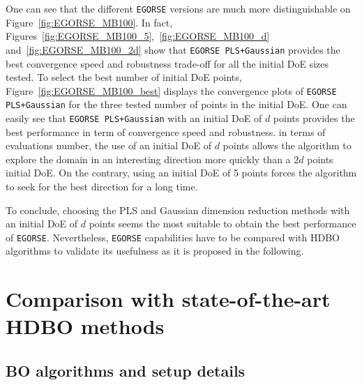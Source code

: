One can see that the different \texttt{EGORSE} versions are much more distinguishable on Figure~\ref{fig:EGORSE_MB100}. 
In fact, Figures~\ref{fig:EGORSE_MB100_5},~\ref{fig:EGORSE_MB100_d} and~\ref{fig:EGORSE_MB100_2d} show that \texttt{EGORSE PLS+Gaussian} provides the best convergence speed and robustness trade-off for all the initial DoE sizes tested.
To select the best number of initial DoE points, Figure~\ref{fig:EGORSE_MB100_best} displays the convergence plots of  \texttt{EGORSE PLS+Gaussian} for the three tested number of points in the initial DoE.
One can easily see that  \texttt{EGORSE PLS+Gaussian} with an initial DoE of $d$ points  provides the best performance in term of convergence speed and robustness.
in terms of evaluations number, the use of an initial DoE of $d$ points allows the algorithm to explore the domain in an interesting direction more quickly than a $2d$ points initial DoE.  
On the contrary, using an initial DoE of 5 points forces the algorithm to seek for the best direction for a long time.

To conclude, choosing the PLS and Gaussian dimension reduction methods with an initial DoE of $d$ points seems the most suitable to obtain the best performance of \texttt{EGORSE}.
Nevertheless, \texttt{EGORSE} capabilities have to be compared with HDBO algorithms to validate its usefulness as it is proposed in the following.

\section{Comparison with state-of-the-art HDBO methods}
\label{sec:num}
\subsection{BO algorithms and setup details}
\label{ssec:setup_all}

